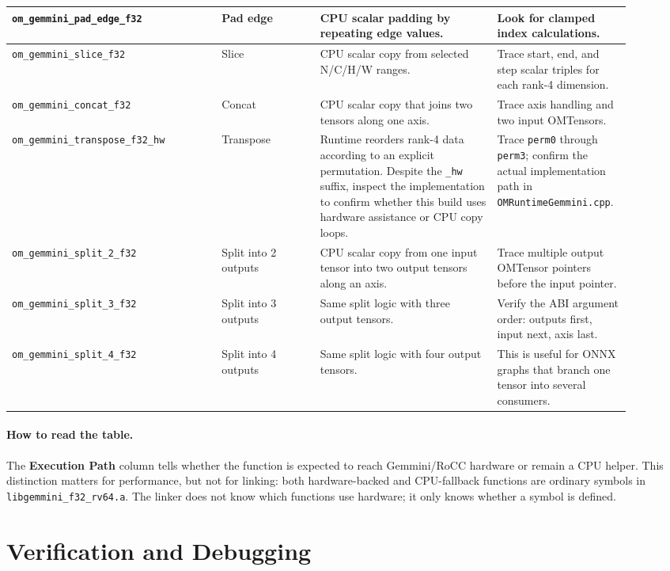 \documentclass[12pt,a4paper]{article}
\newcommand{\file}[1]{\textcolor{fileteal}{\texttt{#1}}}
\begin{document}
\begin{longtable}{@{}p{0.32\linewidth}p{0.15\linewidth}p{0.27\linewidth}p{0.17\linewidth}@{}}
\midrule
\texttt{om\_gemmini\_pad\_edge\_f32} &
Pad edge &
CPU scalar padding by repeating edge values. &
Look for clamped index calculations. \\
\midrule
\texttt{om\_gemmini\_slice\_f32} &
Slice &
CPU scalar copy from selected N/C/H/W ranges. &
Trace start, end, and step scalar triples for each rank-4 dimension. \\
\midrule
\texttt{om\_gemmini\_concat\_f32} &
Concat &
CPU scalar copy that joins two tensors along one axis. &
Trace axis handling and two input OMTensors. \\
\midrule
\texttt{om\_gemmini\_transpose\_f32\_hw} &
Transpose &
Runtime reorders rank-4 data according to an explicit permutation. Despite the
\texttt{\_hw} suffix, inspect the implementation to confirm whether this build
uses hardware assistance or CPU copy loops. &
Trace \texttt{perm0} through \texttt{perm3}; confirm the actual implementation
path in \file{OMRuntimeGemmini.cpp}. \\
\midrule
\texttt{om\_gemmini\_split\_2\_f32} &
Split into 2 outputs &
CPU scalar copy from one input tensor into two output tensors along an axis. &
Trace multiple output OMTensor pointers before the input pointer. \\
\midrule
\texttt{om\_gemmini\_split\_3\_f32} &
Split into 3 outputs &
Same split logic with three output tensors. &
Verify the ABI argument order: outputs first, input next, axis last. \\
\midrule
\texttt{om\_gemmini\_split\_4\_f32} &
Split into 4 outputs &
Same split logic with four output tensors. &
This is useful for ONNX graphs that branch one tensor into several consumers. \\
\end{longtable}
\normalsize
\renewcommand{\arraystretch}{1.0}

\paragraph{How to read the table.}
The \textbf{Execution Path} column tells whether the function is expected to
reach Gemmini/RoCC hardware or remain a CPU helper. This distinction matters for
performance, but not for linking: both hardware-backed and CPU-fallback functions
are ordinary symbols in \file{libgemmini\_f32\_rv64.a}. The linker does not know
which functions use hardware; it only knows whether a symbol is defined.

\section{Verification and Debugging}
\end{document}
